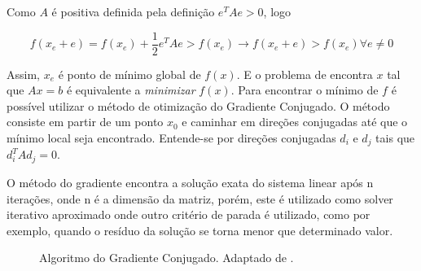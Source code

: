 Como $A$ é positiva definida pela definição $e^TAe  > 0$, logo

\begin{equation}
    f(x_e + e) = f(x_e) + \frac{1}{2}  e^TAe > f(x_e)\rightarrow  f(x_e + e) > f(x_e) \forall e \neq 0
\end{equation}


Assim, $x_e$ é ponto de mínimo global de $f(x)$. E o problema de encontra $x$ tal que $Ax = b$ é equivalente a \textit{minimizar} $f(x)$. Para encontrar o mínimo de $f$ é possível utilizar o método de otimização do Gradiente Conjugado. O método consiste em partir de um ponto $x_0$ e caminhar em direções conjugadas até que o mínimo local seja encontrado. Entende-se por direções conjugadas $d_i$ e $d_j$ tais que $d_i^TAd_j=0$. 

O método do gradiente encontra a solução exata do sistema linear após n iterações, onde n é a dimensão da matriz, porém, este é utilizado como solver iterativo aproximado onde outro critério de parada é utilizado, como por exemplo, quando o resíduo da solução se torna menor que determinado valor. 


\begin{figure}
    \centering
\noindent{}
    \caption{Algoritmo do Gradiente Conjugado. Adaptado de \citet{Shewchuk94anintroduction}. }
    \label{fig:algoritmocgprecon}

\end{figure}



